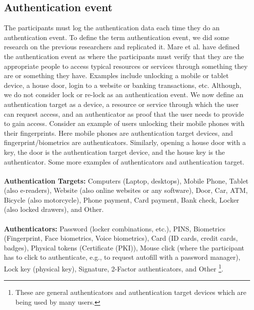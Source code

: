 \subsection{Authentication event}
The participants must log the authentication data each time they do an authentication event. To define the term authentication event, we did some research on the previous researchers \cite{197318} and replicated it. Mare et al. \cite{197318} have defined the authentication event as where the participants must verify that they are the appropriate people to access typical resources or services through something they are or something they have. Examples include unlocking a mobile or tablet device, a house door, login to a website or banking transactions, etc. Although, we do not consider lock or re-lock as an authentication event. We now define an authentication target as a device, a resource or service through which the user can request access, and an authenticator as proof that the user needs to provide to gain access. Consider an example of users unlocking their mobile phones with their fingerprints. Here mobile phones are authentication target devices, and fingerprint/biometrics are authenticators. Similarly, opening a house door with a key, the door is the authentication target device, and the house key is the authenticator. Some more examples of authenticators and authentication target. \\ \\
\noindent
\textbf{Authentication Targets:} Computers (Laptop, desktops), Mobile Phone, Tablet (also e-readers), Website (also online websites or any software), Door, Car, ATM, Bicycle (also motorcycle), Phone payment, Card payment, Bank check, Locker (also locked drawers), and Other.
\\ \\
\noindent
\textbf{Authenticators:} Password (locker combinations, etc.), PINS, Biometrics (Fingerprint, Face biometrics, Voice biometrics), Card (ID cards, credit cards, badges), Physical tokens (Certificate (PKI)), Mouse click (where the participant has to click to authenticate, e.g., to request autofill with a password manager), Lock key (physical key), Signature, 2-Factor authenticators, and Other%
\footnote{These are general authenticators and authentication target devices which are being used by many users.}.

